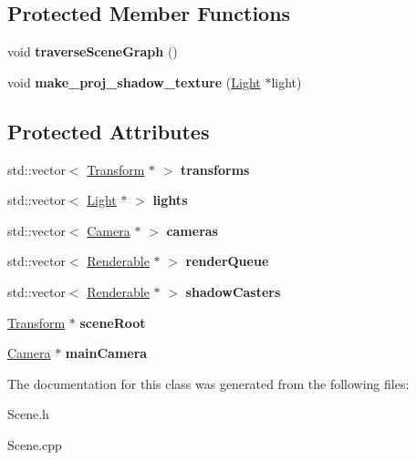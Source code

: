 \subsection*{Protected Member Functions}
\begin{DoxyCompactItemize}
\item 
\hypertarget{class_scene_a51c2c0fbc037c46049e4dc48567c17bb}{
void {\bfseries traverseSceneGraph} ()}
\label{class_scene_a51c2c0fbc037c46049e4dc48567c17bb}

\item 
\hypertarget{class_scene_a8325c012e9d12ca4afe9b50aaeecb4a1}{
void {\bfseries make\_\-proj\_\-shadow\_\-texture} (\hyperlink{class_light}{Light} $\ast$light)}
\label{class_scene_a8325c012e9d12ca4afe9b50aaeecb4a1}

\end{DoxyCompactItemize}
\subsection*{Protected Attributes}
\begin{DoxyCompactItemize}
\item 
\hypertarget{class_scene_a4010430ecd2e23c7d96764e6fdacb1a6}{
std::vector$<$ \hyperlink{class_transform}{Transform} $\ast$ $>$ {\bfseries transforms}}
\label{class_scene_a4010430ecd2e23c7d96764e6fdacb1a6}

\item 
\hypertarget{class_scene_a4ecc3182a80435e1c4dfbe1b20e559bd}{
std::vector$<$ \hyperlink{class_light}{Light} $\ast$ $>$ {\bfseries lights}}
\label{class_scene_a4ecc3182a80435e1c4dfbe1b20e559bd}

\item 
\hypertarget{class_scene_a766a660b1b9d851b14157a6d9373f719}{
std::vector$<$ \hyperlink{class_camera}{Camera} $\ast$ $>$ {\bfseries cameras}}
\label{class_scene_a766a660b1b9d851b14157a6d9373f719}

\item 
\hypertarget{class_scene_a38d0a48c9b531a3012bbb14f0455ddf0}{
std::vector$<$ \hyperlink{class_renderable}{Renderable} $\ast$ $>$ {\bfseries renderQueue}}
\label{class_scene_a38d0a48c9b531a3012bbb14f0455ddf0}

\item 
\hypertarget{class_scene_ac40b87dab6f00fa2ad4819c52559d699}{
std::vector$<$ \hyperlink{class_renderable}{Renderable} $\ast$ $>$ {\bfseries shadowCasters}}
\label{class_scene_ac40b87dab6f00fa2ad4819c52559d699}

\item 
\hypertarget{class_scene_ad9ed8db8f6868234e789557e267cc2e7}{
\hyperlink{class_transform}{Transform} $\ast$ {\bfseries sceneRoot}}
\label{class_scene_ad9ed8db8f6868234e789557e267cc2e7}

\item 
\hypertarget{class_scene_a878011b448f85714694abf6ddeee9376}{
\hyperlink{class_camera}{Camera} $\ast$ {\bfseries mainCamera}}
\label{class_scene_a878011b448f85714694abf6ddeee9376}

\end{DoxyCompactItemize}


The documentation for this class was generated from the following files:\begin{DoxyCompactItemize}
\item 
Scene.h\item 
Scene.cpp\end{DoxyCompactItemize}
